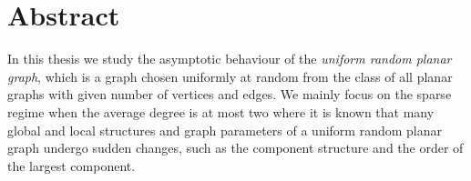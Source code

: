 \documentclass[twoside,openright,bibliography=totoc]{scrreprt}
\theoremstyle{remark}
\theoremstyle{definition}
\theoremstyle{claim}
\begin{document}











\printthesistitle

\printaffidavit



\chapter*{Abstract}

In this thesis we study the asymptotic behaviour of the {\em uniform random planar graph}, which is a graph chosen uniformly at random from the class of all planar graphs with given number of vertices and edges. We mainly focus on the sparse regime when the average degree is at most two where it is known that many global and local structures and graph parameters of a uniform random planar graph undergo sudden changes, such as the component structure and the order of the largest component.
\end{document}
